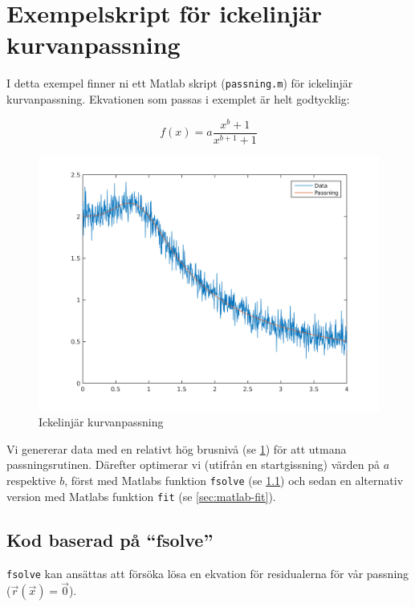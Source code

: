 \section{Exempelskript för ickelinjär kurvanpassning}
\label{sec:matlab-nonlinear}
I detta exempel finner ni ett Matlab skript ({\tt passning.m}) för
ickelinjär kurvanpassning. Ekvationen som passas i exemplet är helt godtycklig:

\begin{equation}
  \label{eq:ex}
  f(x) = a\frac{x^b+1}{x^{b+1}+1}
\end{equation}

\begin{figure}
  \centering
  \includegraphics[scale=0.5]{matlab/passning.png}
  \caption{Ickelinjär kurvanpassning}
  \label{fig:matlab-nonlinear}
\end{figure}

Vi genererar data med en relativt hög brusnivå (se
\cref{fig:matlab-nonlinear}) för att utmana passningsrutinen. Därefter
optimerar vi (utifrån en startgissning) värden på $a$ respektive $b$,
först med Matlabs funktion {\tt fsolve} (se \cref{sec:matlab-fsolve}) och
sedan en alternativ version med Matlabs funktion {\tt fit} (se
\cref{sec:matlab-fit}).

\subsection{Kod baserad på ``fsolve''}
\label{sec:matlab-fsolve}
{\tt fsolve} kan ansättas att försöka lösa en ekvation för
residualerna för vår passning ($\vec{r}(\vec{x}) = \vec{0}$).

